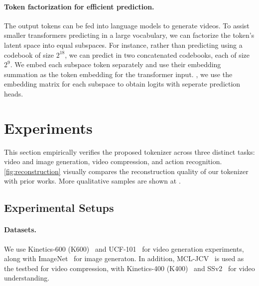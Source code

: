 \paragraph{Token factorization for efficient prediction.}
The output tokens can be fed into language models to generate videos. To assist smaller transformers predicting in a large vocabulary, we can factorize the \quantizername{} token's latent space into equal subspaces. For instance, rather than predicting using a codebook of size $2^{18}$, we can predict in two concatenated codebooks, each of size $2^9$. We embed each subspace token separately and use their embedding summation as the token embedding for the transformer input. , we use the embedding matrix for each subspace to obtain logits with seperate prediction heads. 

\vspace{-4mm}
\section{Experiments}
\vspace{-2mm}
This section empirically verifies the proposed tokenizer across three distinct tasks: video and image generation, video compression, and action recognition.
\cref{fig:reconstruction} visually compares the reconstruction quality of our tokenizer with prior works.
More qualitative samples are shown at \webpage{}.

\vspace{-2mm}
\subsection{Experimental Setups}
\vspace{-2mm}
\paragraph{Datasets.} 
We use Kinetics-600 (K600)~\citep{carreira2018short} and UCF-101~\citep{soomro2012ucf101} for video generation experiments, along with ImageNet~\citep{deng2009imagenet} for image generaton.
In addition, MCL-JCV~\citep{wang2016mcl} is used as the testbed for video compression, with Kinetics-400 (K400)~\citep{kay2017kinetics} and SSv2~\citep{goyal2017something} for video understanding. 
\vspace{-4mm}

